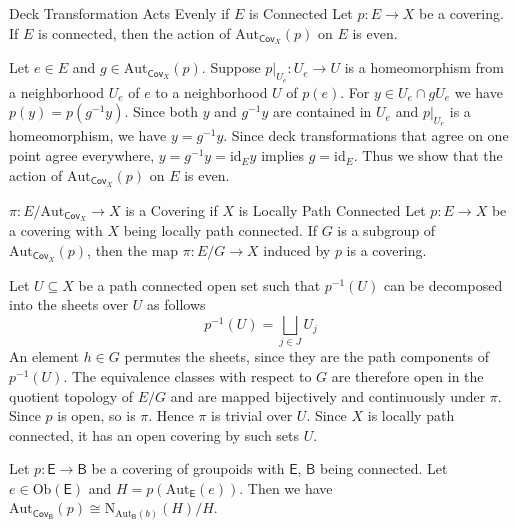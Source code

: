 \documentclass{report}
\begin{document}
\begin{proposition}{Deck Transformation Acts Evenly if $E$ is Connected}{}
	Let $p: E \rightarrow X$ be a covering. If $E$ is connected, then the action of $\mathrm{Aut}_{\mathsf{Cov}_X}(p)$ on $E$ is even.
\end{proposition}
\begin{prf}
	Let $e \in E$ and $g \in \mathrm{Aut}_{\mathsf{Cov}_X}(p)$. Suppose $p|_{U_e}:U_e\to U$ is a homeomorphism from a neighborhood $U_e$ of $e$ to a neighborhood $U$ of $p(e)$. For $y \in U_e \cap g U_e$ we have $p(y)=p\left(g^{-1} y\right)$. Since both $y$ and $g^{-1} y$ are contained in $U_e$ and $p|_{U_e}$ is a homeomorphism, we have $y=g^{-1} y$. Since deck transformations that agree on one point agree everywhere, $y=g^{-1} y=\mathrm{id}_{E} y$ implies $g=\mathrm{id}_{E}$. Thus we show that the action of $\mathrm{Aut}_{\mathsf{Cov}_X}(p)$ on $E$ is even.
\end{prf}

\begin{proposition}{$\pi: E / \mathrm{Aut}_{\mathsf{Cov}_X} \rightarrow X$ is a Covering if $X$ is Locally Path Connected}{}
	Let $p: E \rightarrow X$ be a covering with $X$ being locally path connected. If $G$ is a subgroup of $\mathrm{Aut}_{\mathsf{Cov}_X}(p)$, then the map $\pi: E / G \rightarrow X$ induced by $p$ is a covering.
\end{proposition}
\begin{prf}
	Let $U \subseteq X$ be a path connected open set such that $p^{-1}(U)$ can be decomposed into the sheets over $U$ as follows
	$$
		p^{-1}(U)=\bigsqcup_{j \in J} U_j
	$$
	An element $h \in G$ permutes the sheets, since they are the path components of $p^{-1}(U)$. The equivalence classes with respect to $G$ are therefore open in the quotient topology of $E / G$ and are mapped bijectively and continuously under $\pi$. Since $p$ is open, so is $\pi$. Hence $\pi$ is trivial over $U$. Since $X$ is locally path connected, it has an open covering by such sets $U$.
\end{prf}

\begin{proposition}{}{}
	Let $p:\mathsf{E}\to \mathsf{B}$ be a covering of groupoids with $\mathsf{E}$, $\mathsf{B}$ being connected. Let $e\in\mathrm{Ob}(\mathsf{E})$ and $H=p(\mathrm{Aut}_{\mathsf{E}}(e))$. Then we have $\mathrm{Aut}_{\mathsf{Cov}_\mathsf{B}}(p)\cong \mathrm{N}_{\mathrm{Aut}_{\mathsf{B}}(b)}(H)/H$.
\end{proposition}
\end{document}
